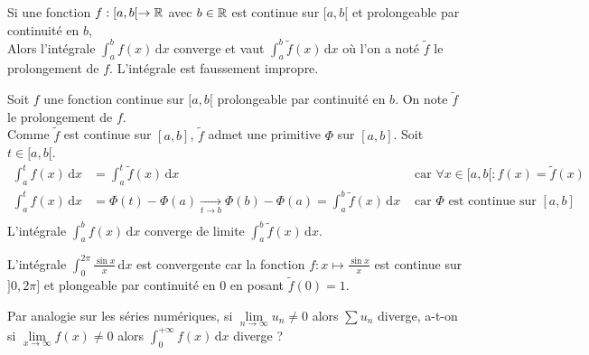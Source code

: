\documentclass{book}
\begin{document}
\begin{Proposition}
Si une fonction $f : [a,b [\to \mathbb{R}$ avec $b \in \mathbb{R}$ est continue sur $[a,b [$ et prolongeable par continuité en $b$,\\
Alors l'intégrale $\int_{a}^{b}f(x)\,\mathrm dx$ converge et vaut $\int_{a}^{b}\tilde{f}(x)\,\mathrm dx$ où l'on a noté $\tilde{f}$ le prolongement de $f$. L'intégrale est faussement impropre.
\end{Proposition}
\begin{Demonstration}
Soit $f$ une  fonction continue sur $[a,b[$ prolongeable par continuité en $b$. On note $\tilde{f}$ le prolongement de $f$.\\
Comme $\tilde{f}$ est continue sur $[a,b]$, $\tilde{f}$ admet une primitive $\Phi$ sur $[a, b]$. Soit $t \in [a, b[$.
$$\begin{aligned}
\int_{a}^{t}f(x)\,\mathrm dx&=\int_{a}^{t}\tilde{f}(x)\,\mathrm dx& \text{ car }\forall x \in [a,b[:f(x)=\tilde{f}(x)\\
\int_{a}^{t}f(x)\,\mathrm dx&=\Phi(t)- \Phi(a)\xrightarrow[t\to b ]{}\Phi(b)- \Phi(a)=\int_{a}^{b}\tilde{f}(x)\,\mathrm dx &\text{ car }\Phi  \text{ est continue sur }[a,b]\\
\end{aligned}$$
L'intégrale  $\int_{a}^{b}f(x)\,\mathrm dx$ converge de limite  $\int_{a}^{b}\tilde{f}(x)\,\mathrm dx$.
\end{Demonstration}
\begin{Exemple}
L'intégrale $\int_{0}^{2\pi}\frac{\sin x}{x}\,\mathrm dx$ est convergente car la fonction $f:x\mapsto\frac{\sin x}{x}$ est continue sur $]0,2\pi]$ et plongeable par continuité en 0 en posant $\tilde{f}(0)=1$. 
\begin{center}
\end{center}
\end{Exemple}
Par analogie sur les séries numériques, si  $\lim\limits_{n\to \infty}u_n \neq 0$ alors $\sum u_n$ diverge, a-t-on
si $\lim\limits_{x\to \infty}f(x)\neq 0$  alors  $\int_{0}^{+\infty}f(x)\,\mathrm dx$ diverge ?\\
\end{document}
